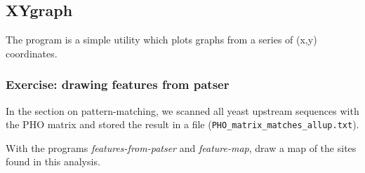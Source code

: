 \subsection{XYgraph}

The program  is a simple utility which plots graphs
from a series of (x,y) coordinates.

\subsubsection{Exercise: drawing features from patser}

In the section on pattern-matching, we scanned all yeast upstream
sequences with the PHO matrix and stored the result in a file
(\texttt{PHO\_matrix\_matches\_allup.txt}).

With the programs \textit{features-from-patser} and
\textit{feature-map}, draw a map of the sites found in this analysis.
